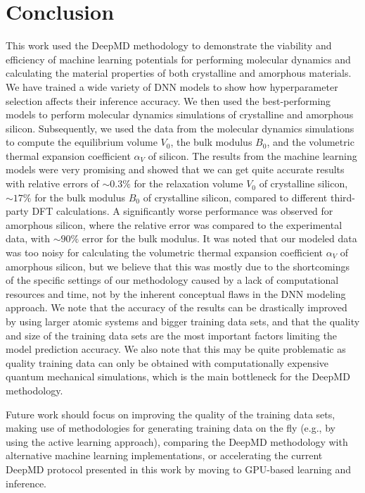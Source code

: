 \chapter{Conclusion}

This work used the DeepMD methodology to demonstrate the viability and
efficiency of machine learning potentials for performing molecular dynamics
and calculating the material properties of both crystalline and amorphous
materials. We have trained a wide variety of DNN models to show how
hyperparameter selection affects their inference accuracy. We then used the
best-performing models to perform molecular dynamics simulations of crystalline and amorphous silicon. Subsequently, we
used the data from the molecular dynamics simulations to compute the
equilibrium volume $V_0$, the bulk modulus $B_0$, and the volumetric thermal
expansion coefficient $\alpha_V$ of silicon. The results from the machine
learning models were very promising and showed that we can get quite accurate
results with relative errors of $\sim 0.3\%$ for the relaxation volume $V_0$
of crystalline silicon, $\sim 17 \%$ for the bulk modulus $B_0$ of crystalline
silicon, compared to different third-party DFT calculations. A significantly
worse performance was observed for amorphous silicon, where the relative error
was compared to the experimental data, with $\sim 90 \%$ error for the bulk modulus.
It was noted that our modeled data was too noisy for calculating the volumetric
thermal expansion coefficient $\alpha_V$ of amorphous silicon, but we believe that this
was mostly due to the shortcomings of the specific settings of our methodology
caused by a lack of computational resources and time, not by the inherent conceptual flaws in
the DNN modeling approach. We note that the accuracy of the results can be
drastically improved by using larger atomic systems and bigger training data sets,
and that the quality and size of the training data sets are the most important factors limiting the
model prediction accuracy. We also note that this may be quite problematic as
quality training data can only be obtained with computationally expensive
quantum mechanical simulations, which is the main bottleneck for the DeepMD
methodology.

Future work should focus on improving the quality of the training data sets,
making use of methodologies for generating training data on the fly (e.g., by
using the active learning approach), comparing the DeepMD methodology with
alternative machine learning implementations, or accelerating the current DeepMD
protocol presented in this work by moving to GPU-based learning and inference.
